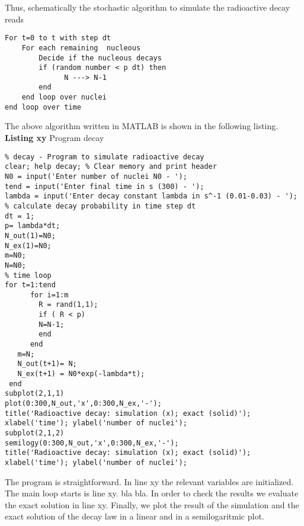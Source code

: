 Thus, schematically the stochastic algorithm to simulate the 
radioactive decay reads

\begin{verbatim}
For t=0 to t with step dt
    For each remaining  nucleous
        Decide if the nucleous decays
        if (random number < p dt) then
              N ---> N-1
        end
    end loop over nuclei
end loop over time
\end{verbatim}

The above algorithm written in MATLAB is shown in the following listing.
{\bf Listing xy} Program decay
\begin{verbatim}
% decay - Program to simulate radioactive decay
clear; help decay; % Clear memory and print header
N0 = input('Enter number of nuclei N0 - ');
tend = input('Enter final time in s (300) - ');
lambda = input('Enter decay constant lambda in s^-1 (0.01-0.03) - ');
% calculate decay probability in time step dt
dt = 1;
p= lambda*dt;
N_out(1)=N0;
N_ex(1)=N0;
m=N0;
N=N0;
% time loop
for t=1:tend
      for i=1:m 
        R = rand(1,1);
        if ( R < p) 
        N=N-1;
        end
      end
   m=N;
   N_out(t+1)= N;
   N_ex(t+1) = N0*exp(-lambda*t);
 end
subplot(2,1,1)
plot(0:300,N_out,'x',0:300,N_ex,'-');
title('Radioactive decay: simulation (x); exact (solid)'); 
xlabel('time'); ylabel('number of nuclei');
subplot(2,1,2)
semilogy(0:300,N_out,'x',0:300,N_ex,'-');
title('Radioactive decay: simulation (x); exact (solid)'); 
xlabel('time'); ylabel('number of nuclei');
\end{verbatim}

The program is straightforward. In line xy the relevant variables 
are initialized. The main loop starts is line xy. bla bla.
In order to check the results we evaluate the exact solution in 
line xy. Finally, we plot the result of the simulation and the 
exact solution of the decay law in a linear and in a 
semilogaritmic plot. 

